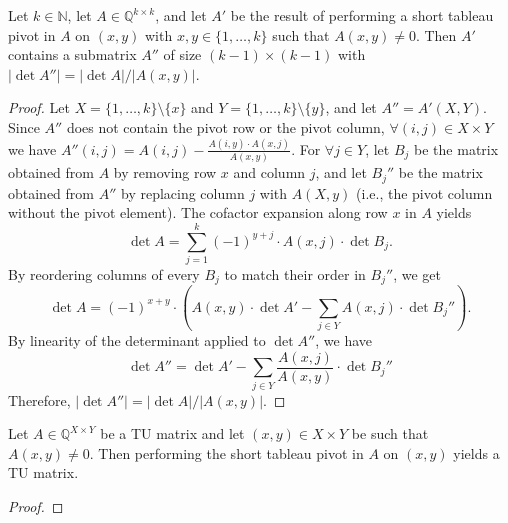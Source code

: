 \begin{lemma}
    \label{shortTableauPivot_submatrix_det_abs_eq_div}
    \leanok
    Let $k \in \mathbb{N}$, let $A \in \mathbb{Q}^{k \times k}$, and let $A'$ be the result of performing a short tableau pivot in $A$ on $(x, y)$ with $x, y \in \{1, \dots, k\}$ such that $A (x, y) \neq 0$. Then $A'$ contains a submatrix $A''$ of size $(k - 1) \times (k - 1)$ with $|\det A''| = |\det A| / |A (x, y)|$.
\end{lemma}

\begin{proof}
    \leanok
    Let $X = \{1, \dots, k\} \setminus \{x\}$ and $Y = \{1, \dots, k\} \setminus \{y\}$, and let $A'' = A' (X, Y)$. Since $A''$ does not contain the pivot row or the pivot column, $\forall (i, j) \in X \times Y$ we have $A'' (i, j) = A (i, j) - \frac{A (i, y) \cdot A (x, j)}{A (x, y)}$. For $\forall j \in Y$, let $B_{j}$ be the matrix obtained from $A$ by removing row $x$ and column $j$, and let $B_{j}''$ be the matrix obtained from $A''$ by replacing column $j$ with $A (X, y)$ (i.e., the pivot column without the pivot element). The cofactor expansion along row $x$ in $A$ yields
    \[
        \det A = \sum_{j = 1}^{k} (-1)^{y + j} \cdot A (x, j) \cdot \det B_{j}.
    \]
    By reordering columns of every $B_{j}$ to match their order in $B_{j}''$, we get
    \[
        \det A = (-1)^{x + y} \cdot \left( A (x, y) \cdot \det A' - \sum_{j \in Y} A (x, j) \cdot \det B_{j}'' \right).
    \]
    By linearity of the determinant applied to $\det A''$, we have
    \[
        \det A'' = \det A' - \sum_{j \in Y} \frac{A (x, j)}{A (x, y)} \cdot \det B_{j}''
    \]
    Therefore, $|\det A''| = |\det A| / |A (x, y)|$.
\end{proof}

\begin{lemma}
    \label{Matrix.IsTotallyUnimodular.shortTableauPivot}
    \leanok
    Let $A \in \mathbb{Q}^{X \times Y}$ be a TU matrix and let $(x, y) \in X \times Y$ be such that $A (x, y) \neq 0$. Then performing the short tableau pivot in $A$ on $(x, y)$ yields a TU matrix.
\end{lemma}

\begin{proof}
    \leanok
    \SeeLean
\end{proof}


